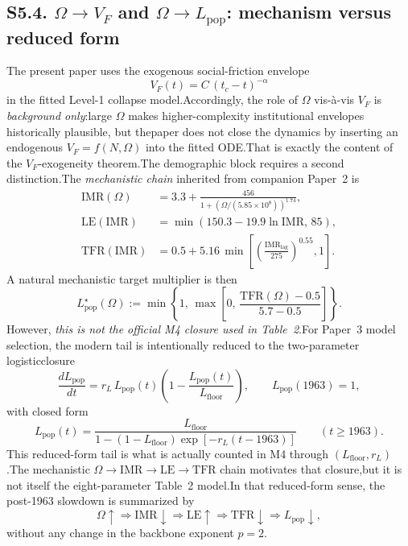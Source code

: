 \documentclass[11pt]{article}
\newcommand{\IMR}{\mathrm{IMR}}
\newcommand{\LE}{\mathrm{LE}}
\newcommand{\TFR}{\mathrm{TFR}}
\begin{document}
\subsection*{S5.4. $\Omega\rightarrow V_F$ and $\Omega\rightarrow L_{\mathrm{pop}}$: mechanism versus reduced form}\label{subsec:S5_to_VF_and_Lpop}
The present paper uses the exogenous social-friction envelope
\begin{equation}V_F(t)=C\,(t_c-t)^{-\alpha}\tag{S5.9}\label{eq:S5_VFenv}\end{equation}
in the fitted Level-1 collapse model.Accordingly, the role of $\Omega$ vis-\`a-vis $V_F$ is \emph{background only}:large $\Omega$ makes higher-complexity institutional envelopes historically plausible, but thepaper does not close the dynamics by inserting an endogenous $V_F=f(N,\Omega)$ into the fitted ODE.That is exactly the content of the $V_F$-exogeneity theorem.The demographic block requires a second distinction.The \emph{mechanistic chain} inherited from companion Paper~2 is
\begin{align}\IMR(\Omega)&=3.3+\frac{456}{1+\left(\Omega/(5.85\times 10^8)\right)^{1.74}},\tag{S5.10}\label{eq:S5_IMR}\\\LE(\IMR)&=\min\!\left(150.3-19.9\ln \IMR,\,85\right),\tag{S5.11}\label{eq:S5_LE}\\\TFR(\IMR)&=0.5+5.16\,\min\!\left[\left(\frac{\IMR_{\mathrm{lag}}}{275}\right)^{0.55},1\right].\tag{S5.12}\label{eq:S5_TFR}\end{align}
A natural mechanistic target multiplier is then
\begin{equation}L_{\mathrm{pop}}^{\star}(\Omega):=\min\!\left\{1,\,\max\!\left[0,\,\frac{\TFR(\Omega)-0.5}{5.7-0.5}\right]\right\}.\tag{S5.13}\label{eq:S5_Lstar}\end{equation}
However, \emph{this is not the official M4 closure used in Table~2}.For Paper~3 model selection, the modern tail is intentionally reduced to the two-parameter logisticclosure
\begin{equation}\frac{dL_{\mathrm{pop}}}{dt}= r_L\,L_{\mathrm{pop}}(t)\!\left(1-\frac{L_{\mathrm{pop}}(t)}{L_{\mathrm{floor}}}\right),\qquad L_{\mathrm{pop}}(1963)=1,\tag{S5.14}\label{eq:S5_L_ode}\end{equation}
with closed form
\begin{equation}L_{\mathrm{pop}}(t)=\frac{L_{\mathrm{floor}}}{1-(1-L_{\mathrm{floor}})\exp[-r_L(t-1963)]}\qquad (t\ge 1963).\tag{S5.15}\label{eq:S5_L_closed}\end{equation}
This reduced-form tail is what is actually counted in M4 through $(L_{\mathrm{floor}},r_L)$.The mechanistic $\Omega\rightarrow\IMR\rightarrow\LE\rightarrow\TFR$ chain motivates that closure,but it is not itself the eight-parameter Table~2 model.In that reduced-form sense, the post-1963 slowdown is summarized by
\begin{equation}\Omega\uparrow\Longrightarrow\IMR\downarrow\Longrightarrow\LE\uparrow\Longrightarrow\TFR\downarrow\Longrightarrow L_{\mathrm{pop}}\downarrow,\tag{S5.16}\label{eq:S5_chain}\end{equation}
without any change in the backbone exponent $p=2$.
\end{document}
